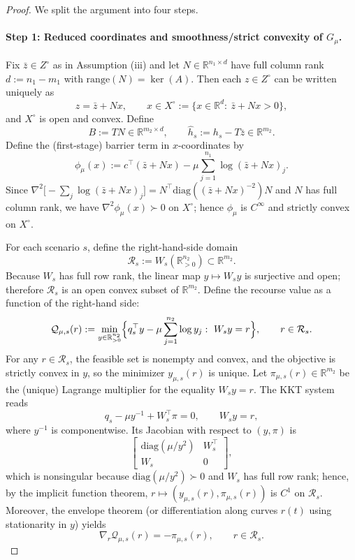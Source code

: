\documentclass[11pt]{article}
\theoremstyle{plain}
\theoremstyle{definition}
\begin{document}
\begin{proof}
We split the argument into four steps.

\paragraph{Step 1: Reduced coordinates and smoothness/strict convexity of $G_\mu$.}
Fix $\bar z\in Z^\circ$ as in Assumption \textnormal{(iii)} and let
$N\in\mathbb{R}^{n_1\times d}$ have full column rank $d:=n_1-m_1$ with
$\mathrm{range}(N)=\ker(A)$. Then each $z\in Z^\circ$ can be written uniquely as
\[
z=\bar z+Nx,\qquad x\in X^\circ:=\{x\in\mathbb{R}^d:\ \bar z+Nx>0\},
\]
and $X^\circ$ is open and convex. Define
\[
B:=TN\in\mathbb{R}^{m_2\times d},
\qquad
\hat h_s:=h_s-T\bar z\in\mathbb{R}^{m_2}.
\]
Define the (first-stage) barrier term in $x$-coordinates by
\[
\phi_\mu(x):=c^\top(\bar z+Nx)-\mu\sum_{j=1}^{n_1}\log(\bar z+Nx)_j.
\]
Since $\nabla^2\bigl[-\sum_j\log(\bar z+Nx)_j\bigr]=N^\top\mathrm{diag}((\bar z+Nx)^{-2})N$ and
$N$ has full column rank, we have $\nabla^2\phi_\mu(x)\succ0$ on $X^\circ$; hence $\phi_\mu$ is $C^\infty$
and strictly convex on $X^\circ$.

For each scenario $s$, define the right-hand-side domain
\[
\mathcal{R}_s:=W_s(\mathbb{R}^{n_2}_{>0})\subset\mathbb{R}^{m_2}.
\]
Because $W_s$ has full row rank, the linear map $y\mapsto W_s y$ is surjective and open;
therefore $\mathcal{R}_s$ is an open convex subset of $\mathbb{R}^{m_2}$.
Define the recourse value as a function of the right-hand side:
\[
\mathcal{Q}_{\mu,s}(r)
:=\min_{y\in\mathbb{R}^{n_2}_{>0}}
\Bigl\{q_s^\top y-\mu\sum_{j=1}^{n_2}\log y_j:\ W_s y=r\Bigr\},
\qquad r\in\mathcal{R}_s.
\]
For any $r\in\mathcal{R}_s$, the feasible set is nonempty and convex, and the objective is strictly convex
in $y$, so the minimizer $y_{\mu,s}(r)$ is unique. Let $\pi_{\mu,s}(r)\in\mathbb{R}^{m_2}$ be the
(unique) Lagrange multiplier for the equality $W_s y=r$. The KKT system reads
\[
q_s-\mu y^{-1}+W_s^\top\pi=0,\qquad W_s y=r,
\]
where $y^{-1}$ is componentwise. Its Jacobian with respect to $(y,\pi)$ is
\[
\begin{bmatrix}
\mathrm{diag}(\mu/y^2) & W_s^\top\\
W_s & 0
\end{bmatrix},
\]
which is nonsingular because $\mathrm{diag}(\mu/y^2)\succ0$ and $W_s$ has full row rank; hence, by the
implicit function theorem, $r\mapsto(y_{\mu,s}(r),\pi_{\mu,s}(r))$ is $C^1$ on $\mathcal{R}_s$.
Moreover, the envelope theorem (or differentiation along curves $r(t)$ using stationarity in $y$)
yields
\begin{equation}
\label{eq:envelope-rec}
\nabla_r\mathcal{Q}_{\mu,s}(r)=-\pi_{\mu,s}(r),\qquad r\in\mathcal{R}_s.
\end{equation}


\end{proof}
\end{document}
